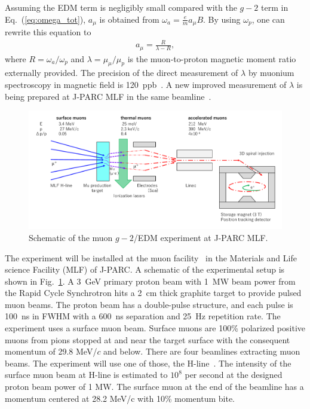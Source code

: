 Assuming the EDM term is negligibly small compared with the $g-2$ term in Eq.~(\ref{eq:omega_tot}), 
$a_\mu$ is obtained from 
$\omega_a = \frac{e}{m} a_\mu B$.
By using $\omega_p$, one can rewrite this equation to
\begin{eqnarray}
a_\mu = \frac{R}{\lambda - R},
\label{eq:amu}
\end{eqnarray}
where $R = \omega_a /\omega_p$ and $\lambda = \mu_\mu/\mu_p$ is the muon-to-proton
magnetic moment ratio externally provided.
The precision of the direct measurement of $\lambda$ by muonium spectroscopy in magnetic field
is 120~ppb~\cite{Liu:1999iz}. 
A new improved measurement of $\lambda$ is being prepared at J-PARC MLF in the same beamline~\cite{Shimomura:2015aza}.

\begin{figure}[t]
  \begin{center}
      \includegraphics[width=18cm,bb=0 0 850 397]{Fig/muonbeam.pdf}
  \end{center}
  \caption{Schematic of the muon $g-2$/EDM experiment at J-PARC MLF. }
  \label{fig:setup}
\end{figure}

The experiment will be installed at the muon facility~\cite{Higemoto:2017} in
the Materials and Life science Facility (MLF) of J-PARC.
A schematic of the experimental setup is shown in Fig.~\ref{fig:setup}. 
A 3~GeV primary proton beam with 1~MW beam power from the Rapid Cycle Synchrotron hits 
a 2~cm thick graphite target to provide pulsed muon beams.
The proton beam has a double-pulse structure, and each pulse is 100~ns in FWHM 
with a 600~ns separation and 25~Hz repetition rate.
The experiment uses a surface muon beam.
Surface muons are 100\% polarized positive muons from pions 
stopped at and near the target surface with the consequent momentum of 29.8 MeV/$c$ and below.
There are four beamlines extracting muon beams.
The experiment will use one of those, the H-line~\cite{Kawamura:2018apy}.
The intensity of the surface muon beam at H-line is estimated 
to $10^8$ per second at the designed proton beam power of 1 MW.
The surface muon at the end of the beamline has a momentum centered at 28.2 MeV/c with 
10\% momentum bite.

